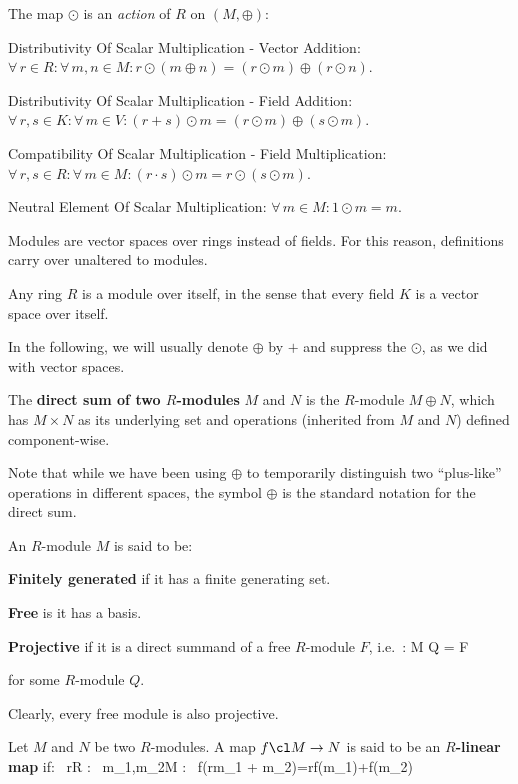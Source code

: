 \item The map $\odot$ is an \emph{action} of $R$ on $(M,\oplus)$:
\ben
\item[vi)] Distributivity Of Scalar Multiplication - Vector Addition: $\forall \, r \in R : \forall \, m,n \in M : r
\odot (m\oplus n) = (r \odot m) \oplus (r \odot n)$.
\item[vii)] Distributivity Of Scalar Multiplication - Field Addition: $\forall \, r,s \in K : \forall \, m \in V :
(r+s)\odot m = (r\odot m)\oplus (s\odot m)$.
\item[viii)] Compatibility Of Scalar Multiplication - Field Multiplication: $\forall \, r,s \in R : \forall \, m \in
M : (r\cdot s)\odot m = r \odot (s\odot m)$.
\item[ix)] Neutral Element Of Scalar Multiplication: $\forall \, m \in M : 1\odot m = m$.
\een
\eit
\ed

Modules are vector spaces over rings instead of fields. For this reason, definitions carry over unaltered to modules.

\be
Any ring $R$ is a module over itself, in the sense that every field $K$ is a vector space over itself.
\ee

In the following, we will usually denote $\oplus$ by $+$ and suppress the $\odot$, as we did with vector spaces.

The \textbf{direct sum of two $R$-modules} $M$ and $N$ is the $R$-module $M\oplus N$, which has $M\times N$ as its
underlying set and operations (inherited from $M$ and $N$) defined component-wise.
\ed

Note that while we have been using $\oplus$ to temporarily distinguish two ``plus-like'' operations in different
spaces, the symbol $\oplus$ is the standard notation for the direct sum.

An $R$-module $M$ is said to be:
\bit
\item \textbf{Finitely generated} if it has a finite generating set.
\item \textbf{Free} is it has a basis.
\item \textbf{Projective} if it is a direct summand of a free $R$-module $F$, i.e.\ :
\bse
M \oplus Q = F
\ese

for some $R$-module $Q$.
\eit
\ed

\be
Clearly, every free module is also projective.
\ee

Let $M$ and $N$ be two $R$-modules. A map $f\cl M \to N$ is said to be an \textbf{$R$-linear map} if:
\bse
\forall \, r\in R : \forall \, m_1,m_2\in M : \ f(rm_1 + m_2)=rf(m_1)+f(m_2)
\ese

